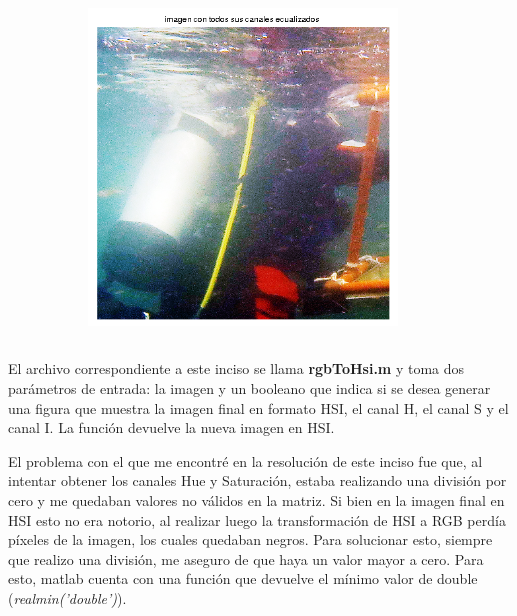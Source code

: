 \documentclass{article}
\begin{document}
\begin{figure}[H]
\begin{subfigure}{0.5\textwidth}
    \end{subfigure}\hfill
	\centering
	\begin{subfigure}{0.5\textwidth}
	\centering
        \includegraphics[width=0.9\textwidth]{1908xx-con-canales-ecualizados.png}
    \end{subfigure}\hfill
\end{figure}

\subsection{}

El archivo correspondiente a este inciso se llama \textbf{rgbToHsi.m} y toma dos parámetros de entrada: la imagen y un booleano que indica si se desea generar una figura que muestra la imagen final en formato HSI, el canal H, el canal S y el canal I. La función devuelve la nueva imagen en HSI.

El problema con el que me encontré en la resolución de este inciso fue que, al intentar obtener los canales Hue y Saturación, estaba realizando una división por cero y me quedaban valores no válidos en la matriz. Si bien en la imagen final en HSI esto no era notorio, al realizar luego la transformación de HSI a RGB perdía píxeles de la imagen, los cuales quedaban negros. Para solucionar esto, siempre que realizo una división, me aseguro de que haya un valor mayor a cero. Para esto, matlab cuenta con una función que devuelve el mínimo valor de double (\textit{realmin('double')}).
\end{document}
